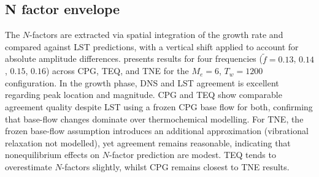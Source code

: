 
\subsection{N factor envelope}
The $N$-factors are extracted via spatial integration of the growth rate and compared against \gls{LST} predictions, with a vertical shift applied to account for absolute amplitude differences.  presents results for four frequencies ($\tilde{f}=0.13$, $0.14$, $0.15$, $0.16$) across \gls{CPG}, \gls{TEQ}, and \gls{TNE} for the $M_e=6$, $T_w=1200$ configuration. In the growth phase, \gls{DNS} and \gls{LST} agreement is excellent regarding peak location and magnitude. \gls{CPG} and \gls{TEQ} show comparable agreement quality despite \gls{LST} using a frozen \gls{CPG} base flow for both, confirming that base-flow changes dominate over thermochemical modelling. For \gls{TNE}, the frozen base-flow assumption introduces an additional approximation (vibrational relaxation not modelled), yet agreement remains reasonable, indicating that nonequilibrium effects on $N$-factor prediction are modest. \gls{TEQ} tends to overestimate $N$-factors slightly, whilst \gls{CPG} remains closest to \gls{TNE} results.

